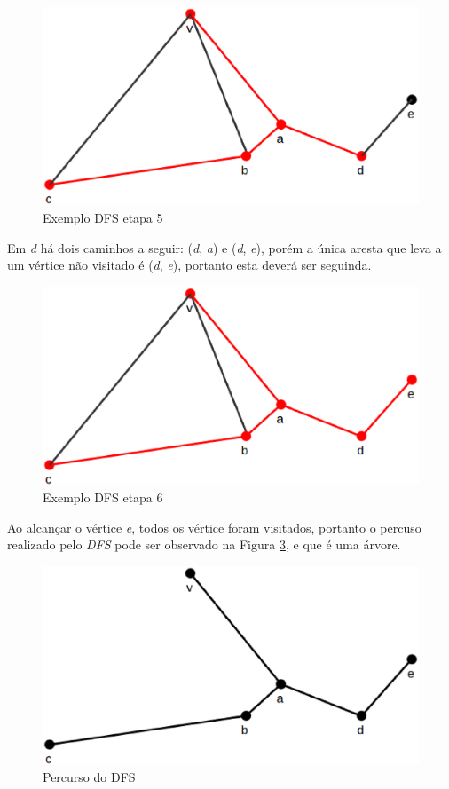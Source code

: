 \begin{figure}[!h]
	\centering
	\includegraphics[scale=0.25]{figuras/capitulo2/dfs/dfs5.eps}
	\caption{Exemplo DFS etapa 5}
	\label{dfs5}
\end{figure}

Em \textit{d} há dois caminhos a seguir: (\textit{d}, \textit{a}) e (\textit{d}, \textit{e}), porém a única aresta que leva a um vértice não visitado é (\textit{d}, \textit{e}), portanto esta deverá ser seguinda.

\begin{figure}[!h]
	\centering
	\includegraphics[scale=0.25]{figuras/capitulo2/dfs/dfs6.eps}
	\caption{Exemplo DFS etapa 6}
	\label{dfs6}
\end{figure}

Ao alcançar o vértice \textit{e}, todos os vértice foram visitados, portanto o percuso realizado pelo \textit{DFS} pode ser observado na Figura \ref{dfs_percurso}, e que é uma árvore.

\begin{figure}[!h]
	\centering
	\includegraphics[scale=0.25]{figuras/capitulo2/dfs/dfs_percurso.eps}
	\caption{Percurso do DFS}
	\label{dfs_percurso}
\end{figure}

